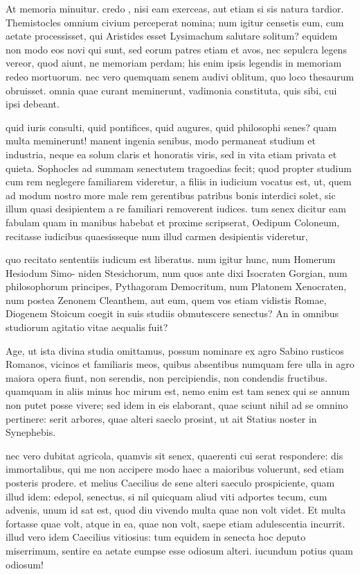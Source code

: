  At memoria minuitur. credo , nisi eam exerceas, aut etiam si sis natura tardior. Themistocles omnium civium perceperat nomina; num igitur censetis eum, cum aetate processisset, qui Aristides esset Lysimachum salutare solitum? equidem non modo eos novi qui sunt, sed eorum patres etiam et avos, nec sepulcra legens vereor, quod aiunt, ne memoriam perdam; his enim ipsis legendis in memoriam redeo mortuorum. nec vero quemquam senem audivi oblitum, quo loco thesaurum obruisset. omnia quae curant meminerunt, vadimonia constituta, quis sibi, cui ipsi debeant.

 quid iuris consulti, quid pontifices, quid augures, quid philosophi senes? quam multa meminerunt! manent ingenia senibus, modo permaneat studium et industria, neque ea solum claris et honoratis viris, sed in vita etiam privata et quieta. Sophocles ad summam senectutem tragoedias fecit; quod propter studium cum rem neglegere familiarem videretur, a filiis in iudicium vocatus est, ut, quem ad modum nostro more male rem gerentibus patribus bonis interdici solet, sic illum quasi desipientem a re familiari removerent iudices. tum senex dicitur eam fabulam quam in manibus habebat et proxime scripserat, Oedipum Coloneum, recitasse iudicibus quaesisseque num illud carmen desipientis videretur,

 quo recitato sententiis iudicum est liberatus. num igitur hunc, num Homerum Hesiodum Simo- niden Stesichorum, num quos ante dixi Isocraten Gorgian, num philosophorum principes, Pythagoram Democritum, num Platonem Xenocraten, num postea Zenonem Cleanthem, aut eum, quem vos etiam vidistis Romae, Diogenem Stoicum coegit in suis studiis obmutescere senectus? An in omnibus studiorum agitatio vitae aequalis fuit?

 Age, ut ista divina studia omittamus, possum nominare ex agro Sabino rusticos Romanos, vicinos et familiaris meos, quibus absentibus numquam fere ulla in agro maiora opera fiunt, non serendis, non percipiendis, non condendis fructibus. quamquam in aliis minus hoc mirum est, nemo enim est tam senex qui se annum non putet posse vivere; sed idem in eis elaborant, quae sciunt nihil ad se omnino pertinere: serit arbores, quae alteri saeclo prosint, ut ait Statius noster in Synephebis.

 nec vero dubitat agricola, quamvis sit senex, quaerenti cui serat respondere: dis immortalibus, qui me non accipere modo haec a maioribus voluerunt, sed etiam posteris prodere. et melius Caecilius de sene alteri saeculo prospiciente, quam illud idem: edepol, senectus, si nil quicquam aliud viti adportes tecum, cum advenis, unum id sat est, quod diu vivendo multa quae non volt videt. Et multa fortasse quae volt, atque in ea, quae non volt, saepe etiam adulescentia incurrit. illud vero idem Caecilius vitiosius: tum equidem in senecta hoc deputo miserrimum, sentire ea aetate eumpse esse odiosum alteri. iucundum potius quam odiosum!

